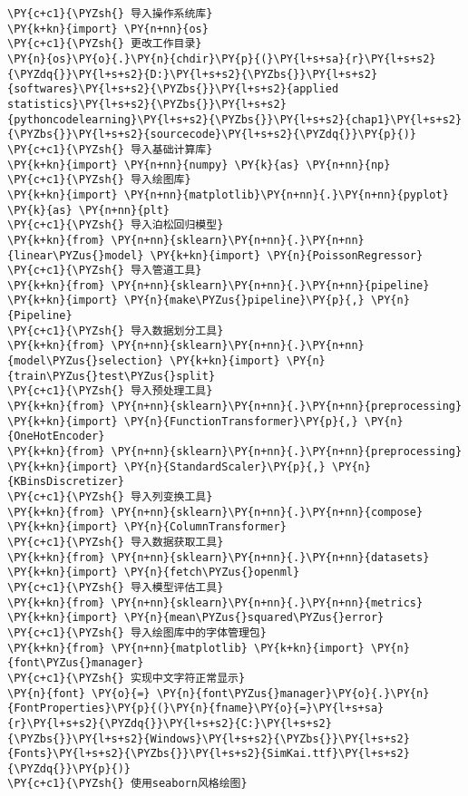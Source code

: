 \begin{Verbatim}[commandchars=\\\{\}]
\PY{c+c1}{\PYZsh{} 导入操作系统库}
\PY{k+kn}{import} \PY{n+nn}{os}
\PY{c+c1}{\PYZsh{} 更改工作目录}
\PY{n}{os}\PY{o}{.}\PY{n}{chdir}\PY{p}{(}\PY{l+s+sa}{r}\PY{l+s+s2}{\PYZdq{}}\PY{l+s+s2}{D:}\PY{l+s+s2}{\PYZbs{}}\PY{l+s+s2}{softwares}\PY{l+s+s2}{\PYZbs{}}\PY{l+s+s2}{applied statistics}\PY{l+s+s2}{\PYZbs{}}\PY{l+s+s2}{pythoncodelearning}\PY{l+s+s2}{\PYZbs{}}\PY{l+s+s2}{chap1}\PY{l+s+s2}{\PYZbs{}}\PY{l+s+s2}{sourcecode}\PY{l+s+s2}{\PYZdq{}}\PY{p}{)}
\PY{c+c1}{\PYZsh{} 导入基础计算库}
\PY{k+kn}{import} \PY{n+nn}{numpy} \PY{k}{as} \PY{n+nn}{np}
\PY{c+c1}{\PYZsh{} 导入绘图库}
\PY{k+kn}{import} \PY{n+nn}{matplotlib}\PY{n+nn}{.}\PY{n+nn}{pyplot} \PY{k}{as} \PY{n+nn}{plt}
\PY{c+c1}{\PYZsh{} 导入泊松回归模型}
\PY{k+kn}{from} \PY{n+nn}{sklearn}\PY{n+nn}{.}\PY{n+nn}{linear\PYZus{}model} \PY{k+kn}{import} \PY{n}{PoissonRegressor}
\PY{c+c1}{\PYZsh{} 导入管道工具}
\PY{k+kn}{from} \PY{n+nn}{sklearn}\PY{n+nn}{.}\PY{n+nn}{pipeline} \PY{k+kn}{import} \PY{n}{make\PYZus{}pipeline}\PY{p}{,} \PY{n}{Pipeline}
\PY{c+c1}{\PYZsh{} 导入数据划分工具}
\PY{k+kn}{from} \PY{n+nn}{sklearn}\PY{n+nn}{.}\PY{n+nn}{model\PYZus{}selection} \PY{k+kn}{import} \PY{n}{train\PYZus{}test\PYZus{}split}
\PY{c+c1}{\PYZsh{} 导入预处理工具}
\PY{k+kn}{from} \PY{n+nn}{sklearn}\PY{n+nn}{.}\PY{n+nn}{preprocessing} \PY{k+kn}{import} \PY{n}{FunctionTransformer}\PY{p}{,} \PY{n}{OneHotEncoder}
\PY{k+kn}{from} \PY{n+nn}{sklearn}\PY{n+nn}{.}\PY{n+nn}{preprocessing} \PY{k+kn}{import} \PY{n}{StandardScaler}\PY{p}{,} \PY{n}{KBinsDiscretizer}
\PY{c+c1}{\PYZsh{} 导入列变换工具}
\PY{k+kn}{from} \PY{n+nn}{sklearn}\PY{n+nn}{.}\PY{n+nn}{compose} \PY{k+kn}{import} \PY{n}{ColumnTransformer}
\PY{c+c1}{\PYZsh{} 导入数据获取工具}
\PY{k+kn}{from} \PY{n+nn}{sklearn}\PY{n+nn}{.}\PY{n+nn}{datasets} \PY{k+kn}{import} \PY{n}{fetch\PYZus{}openml}
\PY{c+c1}{\PYZsh{} 导入模型评估工具}
\PY{k+kn}{from} \PY{n+nn}{sklearn}\PY{n+nn}{.}\PY{n+nn}{metrics} \PY{k+kn}{import} \PY{n}{mean\PYZus{}squared\PYZus{}error}
\PY{c+c1}{\PYZsh{} 导入绘图库中的字体管理包}
\PY{k+kn}{from} \PY{n+nn}{matplotlib} \PY{k+kn}{import} \PY{n}{font\PYZus{}manager}
\PY{c+c1}{\PYZsh{} 实现中文字符正常显示}
\PY{n}{font} \PY{o}{=} \PY{n}{font\PYZus{}manager}\PY{o}{.}\PY{n}{FontProperties}\PY{p}{(}\PY{n}{fname}\PY{o}{=}\PY{l+s+sa}{r}\PY{l+s+s2}{\PYZdq{}}\PY{l+s+s2}{C:}\PY{l+s+s2}{\PYZbs{}}\PY{l+s+s2}{Windows}\PY{l+s+s2}{\PYZbs{}}\PY{l+s+s2}{Fonts}\PY{l+s+s2}{\PYZbs{}}\PY{l+s+s2}{SimKai.ttf}\PY{l+s+s2}{\PYZdq{}}\PY{p}{)}
\PY{c+c1}{\PYZsh{} 使用seaborn风格绘图}

\end{Verbatim}
